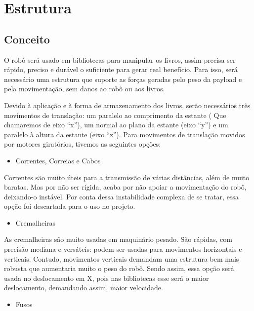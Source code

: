 

\section[Estrutura] {Estrutura}
\subsection{Conceito}

O robô será usado em bibliotecas para manipular os livros, assim precisa ser rápido, preciso e durável o suficiente para gerar real benefício. Para isso, será necessário uma estrutura que suporte as forças geradas pelo peso da payload e pela movimentação, sem danos ao robô ou aos livros.

Devido à aplicação e à forma de armazenamento dos livros, serão necessários três movimentos de translação: um paralelo ao comprimento da estante ( Que chamaremos de eixo “x”), um normal ao plano da estante (eixo “y”) e um paralelo à altura da estante (eixo “z”). Para movimentos de translação movidos por motores giratórios, tivemos as seguintes opções:

\begin{itemize}
\item{Correntes, Correias e Cabos}
\end{itemize}

Correntes são muito úteis para a transmissão de várias distâncias, além de muito baratas. Mas por não ser rígida, acaba por não apoiar a movimentação do robô, deixando-o instável. Por conta dessa instabilidade complexa de se tratar, essa opção foi descartada para o uso no projeto.  

\begin{itemize}
\item{Cremalheiras}
\end{itemize}

As cremalheiras são muito usadas em maquinário pesado. São rápidas, com precisão mediana e versáteis: podem ser usadas para movimentos horizontais e verticais. Contudo, movimentos verticais demandam uma estrutura bem mais robusta que aumentaria muito o peso do robô. Sendo assim, essa opção será usada no deslocamento em X, pois nas bibliotecas esse será o maior deslocamento, demandando assim, maior velocidade.

\begin{itemize}
\item{Fusos}
\end{itemize}

